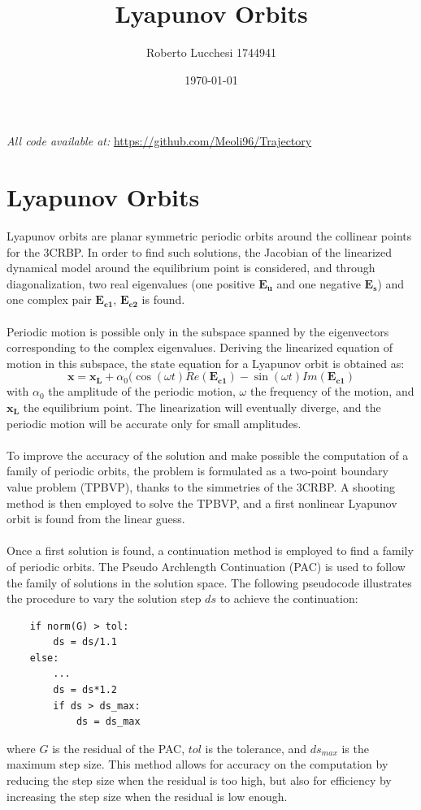 \documentclass{report}
\title{#1}
\author{#2}
\date{#3}
\newcommand{\report}[3]{
    \title{#1}
    \author{#2}
    \date{#3}
    \maketitle
}
\begin{document}
\report{Lyapunov Orbits}{Roberto Lucchesi 1744941}{\today}

\vfill
\begin{center}
    \textit{All code available at:} \url{https://github.com/Meoli96/Trajectory}
\end{center}

\newpage

\section*{Lyapunov Orbits}
Lyapunov orbits are planar symmetric periodic orbits around the collinear points for the 3CRBP.
In order to find such solutions, the Jacobian of the linearized dynamical model around the 
equilibrium point is considered, and through diagonalization, 
two real eigenvalues (one positive $\boldsymbol{E_u}$ and one negative $\boldsymbol{E_s}$) 
and one complex pair $\boldsymbol{E_{c1}}$, $\boldsymbol{E_{c2}}$ is found.\\\\
Periodic motion is possible only in the subspace spanned by the eigenvectors corresponding to the complex eigenvalues.
Deriving the linearized equation of motion in this subspace, the state equation for a Lyapunov orbit is obtained as:
\begin{equation}
    \boldsymbol{x} = \boldsymbol{x_L} + \alpha_0(\cos(\omega t)Re({\boldsymbol{E_{c1}}}) - \sin(\omega t)Im({\boldsymbol{E_{c1}}})
\end{equation}
with $\alpha_0$ the amplitude of the periodic motion, $\omega$ the frequency of the motion, and $\boldsymbol{x_L}$ the equilibrium point.
The linearization will eventually diverge, and the periodic motion will be accurate only for small amplitudes. \\\\
To improve the accuracy of the solution and make possible the computation of a family of periodic orbits, the problem is formulated as a two-point boundary value problem (TPBVP), thanks to the simmetries of the 3CRBP.
A shooting method is then employed to solve the TPBVP, and a first nonlinear Lyapunov orbit is found from the linear guess.\\\\
Once a first solution is found, a continuation method is employed to find a family of periodic orbits. The Pseudo Archlength Continuation (PAC) is used to follow the family of solutions in the solution space. The following pseudocode illustrates the procedure to 
vary the solution step $d s$ to achieve the continuation:
\begin{verbatim}
    if norm(G) > tol:
        ds = ds/1.1
    else:
        ...
        ds = ds*1.2
        if ds > ds_max:
            ds = ds_max
\end{verbatim}
where $G$ is the residual of the PAC, $tol$ is the tolerance, and $ds_{max}$ is the maximum step size.
This method allows for accuracy on the computation by reducing the step size when the residual is too high, but also for efficiency by increasing the step size when the residual is low enough.\\\\
\end{document}
